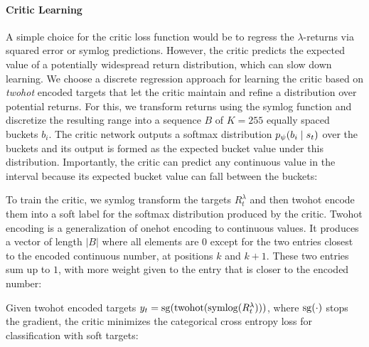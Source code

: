 \paragraph{Critic Learning}
A simple choice for the critic loss function would be to regress the $\lambda$-returns via squared error or symlog predictions. However, the critic predicts the expected value of a potentially widespread return distribution, which can slow down learning. We choose a discrete regression approach for learning the critic based on \emph{twohot} encoded targets \citep{bellemare2017c51,schrittwieser2019muzero,imani2018distregression,van2019nonlinearbellman} that let the critic maintain and refine a distribution over potential returns. For this, we transform returns using the symlog function and discretize the resulting range into a sequence $B$ of $K=255$ equally spaced buckets $b_i$. The critic network outputs a softmax distribution $\p<p_\psi>(b_i|s_t)$ over the buckets and its output is formed as the expected bucket value under this distribution. Importantly, the critic can predict any continuous value in the interval because its expected bucket value can fall between the buckets:


To train the critic, we symlog transform the targets $R^\lambda_t$ and then twohot encode them into a soft label for the softmax distribution produced by the critic. Twohot encoding is a generalization of onehot encoding to continuous values. It produces a vector of length $|B|$ where all elements are $0$ except for the two entries closest to the encoded continuous number, at positions $k$ and $k+1$. These two entries sum up to $1$, with more weight given to the entry that is closer to the encoded number:


Given twohot encoded targets $y_t = \operatorname{sg}(\operatorname{twohot}(\operatorname{symlog}(R^\lambda_t)))$, where $\operatorname{sg}(\cdot)$ stops the gradient, the critic minimizes the categorical cross entropy loss for classification with soft targets:

